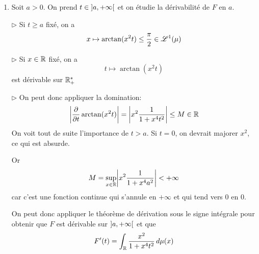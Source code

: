 {\begin{td-sol}[]
\begin{enumerate}
            Pour l'argument de domination, on a la majoration et par le théorème
            de continuité sous le signe intégrale, on a \(F\) continue sur \(\R_+^\ast\).

            Enfin, pour \(t=0\), on regarde la limite à droite.
            \(\triangleright\) Le même argument de domination nous donne que
            \begin{equation*}
                \lim_{n\to+\infty}\arctan{x t_n} = \arctan(0) = 0
            \end{equation*}
            et donc
            \begin{equation*}
                F(0)=\int 0 = 0
            \end{equation*}
            et donc \(F\) est continue sur \(\R_+\).

            \item Soit \(a>0\). On prend \(t\in\mathopen{}\left]a,+\infty\right[\mathclose{}\) et on étudie la dérivabilité de \(F\) en \(a\).

            \(\triangleright\) Si \(t\geq a\) fixé, on a
            \begin{equation*}
                x\mapsto \arctan(x^2t) \leq \frac{\pi}{2}\in\mathscr{L}^1(\mu)
            \end{equation*}

            \(\triangleright\) Si \(x\in \mathbb{R}\) fixé, on a
            \begin{equation*}
                t\mapsto \arctan(x^2t)
            \end{equation*}
            est dérivable sur \(\R_+^\ast\)

            \(\triangleright\) On peut donc appliquer la domination:
            \begin{equation*}
                \mathopen{}\left|\frac{\partial}{\partial t}\arctan(x^2t)\right|\mathclose{}
                = \mathopen{}\left|x^2\frac{1}{1+x^4t^2}\right|\mathclose{}\leq M\in\mathbb{R}
            \end{equation*}
            On voit tout de suite l'importance de \(t>a\). Si \(t=0\), on
            devrait majorer \(x^2\), ce qui est absurde.

            Or
            \begin{equation*}
                M = \sup_{x\in\mathbb{R}}\mathopen{}\left|x^2\frac{1}{1+x^4a^2}\right|\mathclose{}<+\infty
            \end{equation*}
            car c'est une fonction continue qui s'annule en \(+\infty\) et qui tend
            vers 0 en 0.

            On peut donc appliquer le théorème de dérivation sous le signe intégrale
            pour obtenir que \(F\) est dérivable sur \(\mathopen{}\left]a,+\infty\right[\mathclose{}\) et que
            \begin{equation}
                F'(t) = \int_{\mathbb{R}}\frac{x^2}{1+x^4t^2}\mathop{}\!{d}\mu(x)\label{eq:arctan_exo_7_3}
            \end{equation}


\end{enumerate}
\end{td-sol}}

